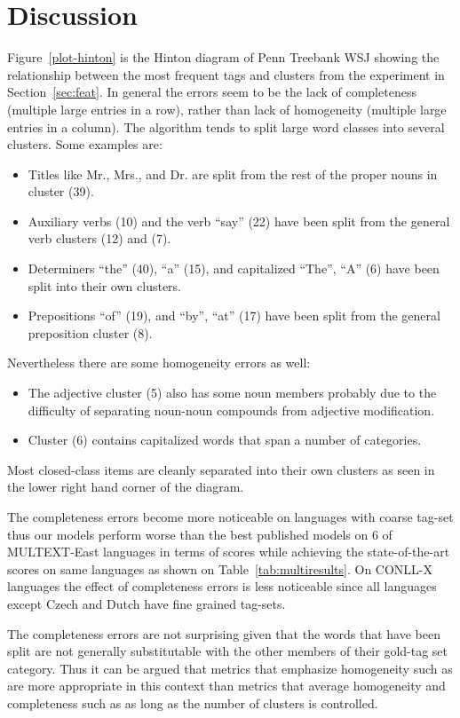 \section{Discussion}
\label{sec:discuss}

Figure~\ref{plot-hinton} is the Hinton diagram of Penn Treebank WSJ
showing the relationship between the most frequent tags and clusters
from the experiment in Section~\ref{sec:feat}.  In general the errors
seem to be the lack of completeness (multiple large entries in a row),
rather than lack of homogeneity (multiple large entries in a column).
The algorithm tends to split large word classes into several clusters.
Some examples are:
\begin{itemize}
\item Titles like Mr., Mrs., and Dr. are split from the rest of the
  proper nouns in cluster (39).
\item Auxiliary verbs (10) and the verb ``say'' (22) have been split
  from the general verb clusters (12) and (7).
\item Determiners ``the'' (40), ``a'' (15), and capitalized
  ``The'', ``A'' (6) have been split into their own clusters.
\item Prepositions ``of'' (19), and ``by'', ``at'' (17) have been
  split from the general preposition cluster (8).
\end{itemize}
Nevertheless there are some homogeneity errors as well:
\begin{itemize} 
\item The adjective cluster (5) also has some noun members probably
  due to the difficulty of separating noun-noun compounds from
  adjective modification.
\item Cluster (6) contains capitalized words that span a number of
  categories.
\end{itemize}
Most closed-class items are cleanly separated into their own clusters
as seen in the lower right hand corner of the diagram. 

The completeness errors become more noticeable on languages with coarse
tag-set thus our models perform worse than the best published models on
6 of MULTEXT-East languages in terms of \vm scores while achieving the
state-of-the-art \mto scores on same languages as shown on
Table~\ref{tab:multiresults}.  On CONLL-X languages the effect of
completeness errors is less noticeable since all languages except Czech
and Dutch have fine grained tag-sets.

The completeness errors are not surprising given that the words that
have been split are not generally substitutable with the other members
of their gold-tag set category.  Thus it can be argued that metrics
that emphasize homogeneity such as \mto are more appropriate in this
context than metrics that average homogeneity and completeness such as
\vm as long as the number of clusters is controlled.

